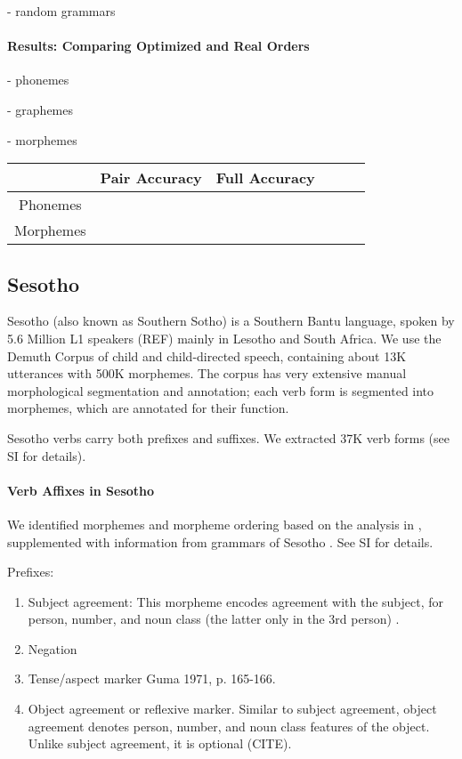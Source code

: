 - random grammars

\paragraph{Results: Comparing Optimized and Real Orders}

- phonemes

- graphemes

- morphemes


\begin{tabular}{c|ccccc}
             & Pair Accuracy & Full Accuracy \\ \hline
Phonemes     &   \\
Morphemes     &  \\
\end{tabular}



\subsection{Sesotho}

Sesotho (also known as Southern Sotho) is a Southern Bantu language, spoken by 5.6 Million L1 speakers (REF) mainly in Lesotho and South Africa.
We use the Demuth Corpus \citep{demuth1992acquisition} of child and child-directed speech, containing about 13K utterances with 500K morphemes.
The corpus has very extensive manual morphological segmentation and annotation; each verb form is segmented into morphemes, which are annotated for their function.

Sesotho verbs carry both prefixes and suffixes.
We extracted 37K verb forms (see SI for details).


\paragraph{Verb Affixes in Sesotho}

We identified morphemes and morpheme ordering based on the analysis in \cite{demuth1992acquisition}, supplemented with information from grammars of Sesotho \citep{doke1967textbook,guma1971outline}. See SI for details.

Prefixes:

\begin{enumerate}
    \item Subject agreement: This morpheme encodes agreement with the subject, for person, number, and noun class (the latter only in the 3rd person) \cite[]{doke1967textbook}.
    
    \item Negation 
    
    \item Tense/aspect marker  Guma 1971, p. 165-166. \cite[-424]{doke1967textbook}
    
    \item Object agreement or reflexive marker. 
    Similar to subject agreement, object agreement denotes person, number, and noun class features of the object.
    Unlike subject agreement, it is optional (CITE).
    \end{enumerate}
    
